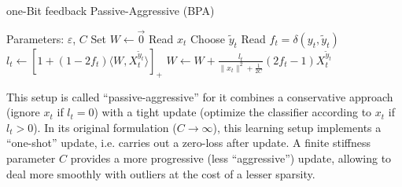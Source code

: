 \documentclass[preprint,12pt,authoryear]{elsarticle}
\begin{document}
\begin{algorithm}[t!]
	\caption{one-Bit feedback Passive-Aggressive (BPA)}\label{algo:quad}
	\begin{algorithmic}
		\STATE Parameters:  $\varepsilon$, $C$
		\STATE Set $W \leftarrow \vec{0}$
		\STATE Read $x_t$
		\STATE Choose $\tilde{y}_t$
		\STATE Read $f_t = \delta(y_t,\tilde{y}_t)$
		\STATE $l_t \leftarrow \left[ 1+(1-2f_t)\langle W,X_t^{\tilde{y}_t}\rangle\right]_{+}$ 
		\STATE $W \leftarrow W + \frac{l_t}{\parallel x_t\parallel^2 + \frac{1}{2C}} (2f_t-1) X_t^{\tilde{y}_t}$
		\ENDFOR
	\end{algorithmic}
\end{algorithm}

This setup is called ``passive-aggressive'' for it combines a conservative approach (ignore $x_t$ if $l_t=0$) with a tight update (optimize the classifier according to $x_t$ if $l_t>0$).
In its original formulation ($C \rightarrow \infty$), this learning setup implements a ``one-shot'' update, i.e. carries out a zero-loss  after update. A finite stiffness parameter $C$ provides a more progressive (less ``aggressive'') update, allowing to deal more smoothly with outliers at the cost of a lesser sparsity.
\end{document}
